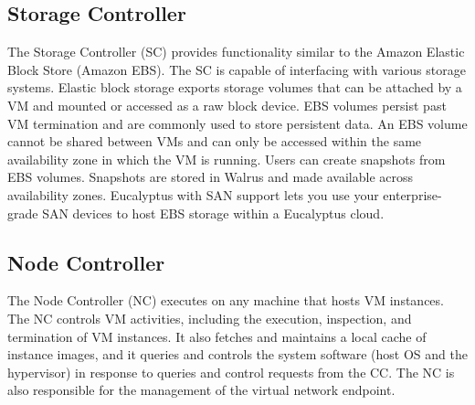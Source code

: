 \subsection{Storage Controller}
The Storage Controller (SC) provides functionality similar to the Amazon Elastic Block Store (Amazon EBS). The SC is capable of interfacing with various storage systems. Elastic block storage exports storage volumes that can be attached by a VM and mounted or accessed as a raw block device. EBS volumes persist past VM termination and are commonly used to store persistent data. An EBS volume cannot be shared between VMs and can only be accessed within the same availability zone in which the VM is running. Users can create snapshots from EBS volumes. Snapshots are stored in Walrus and made available across availability zones. Eucalyptus with SAN support lets you use your enterprise-grade SAN devices to host EBS storage within a Eucalyptus cloud.
\subsection{Node Controller}
The Node Controller (NC) executes on any machine that hosts VM instances. The NC controls VM activities, including the execution, inspection, and termination of VM instances. It also fetches and maintains a local cache of instance images, and it queries and controls the system software (host OS and the hypervisor) in response to queries and control requests from the CC. The NC is also responsible for the management of the virtual network endpoint.

